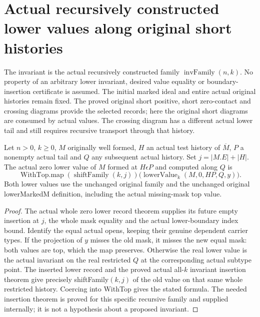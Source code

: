 \section{Actual recursively constructed lower values along original short histories}

The invariant is the actual recursively constructed family $\operatorname{invFamily}(n,k)$.
No property of an arbitrary lower invariant, desired value equality or
boundary-insertion certificate is assumed.  The initial marked ideal and
entire actual original histories remain fixed.  The proved original short
positive, short zero-contact and crossing diagrams provide the selected
records; here the original short diagrams are consumed by actual values.
The crossing diagram has a different actual lower tail and still requires
recursive transport through that history.

\begin{theorem}
\label{hir:original-interior-full-family-zero-lower-value}
\leanok
{}
Let $n>0$, $k\geq0$, $M$ originally well formed, $H$ an actual test history
of $\overline M$, $P$ a nonempty actual tail and $Q$ any subsequent actual
history.  Set $j=|M.E|+|H|$.  The actual zero lower value of $M$ formed at
$H\epsilon P$ and computed along $Q$ is
\[
 \operatorname{WithTop.map}(\operatorname{shiftFamily}(k,j))
    \bigl(\operatorname{lowerValue}_k(M,0,HP,Q,y)\bigr).
\]
Both lower values use the unchanged original family and the unchanged
original lowerMarkedM definition, including the actual missing-mask top value.
\end{theorem}
\begin{proof}
The actual whole zero lower record theorem supplies its future empty
insertion at $j$, the whole mask equality and the actual lower-boundary
index bound.  Identify the equal actual opens, keeping their genuine
dependent carrier types.  If the projection of $y$ misses the old mask,
it misses the new equal mask: both values are top, which the map preserves.
Otherwise the real lower value is the actual invariant on the real
restricted $Q$ at the corresponding actual subtype point.  The inserted
lower record and the proved actual all-$k$ invariant insertion theorem
give precisely shiftFamily$(k,j)$ of the old value on that same whole
restricted history.  Coercing into WithTop gives the stated formula.
The needed insertion theorem is proved for this specific recursive family
and supplied internally; it is not a hypothesis about a proposed invariant.
\end{proof}


